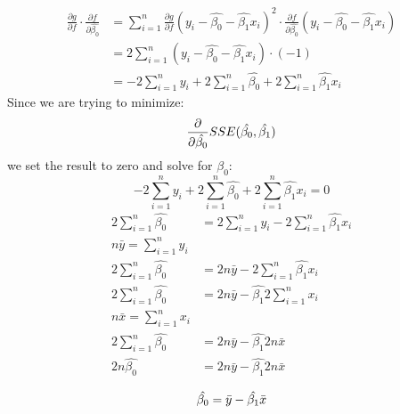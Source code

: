 \documentclass{article}
\begin{document}
\begin{align*}
\frac{\partial g}{\partial f}\cdot\frac{\partial f} {\partial \hat{\beta_0}} & = 
\sum_{i=1}^{n} \frac{\partial g}{\partial f} (y_i - \hat{\beta_{0}} - \hat{\beta_{1}}x_i)^2 \cdot \frac{\partial f} {\partial \hat{\beta_0}} (y_i - \hat{\beta_{0}} - \hat{\beta_{1}}x_i) \\
& = 2 \sum_{i=1}^{n} (y_i - \hat{\beta_{0}} - \hat{\beta_{1}}x_i) \cdot 
(-1) \\
& =  -2\sum_{i=1}^{n}y_i  + 2\sum_{i=1}^{n}\hat{\beta_{0}} + 2\sum_{i=1}^{n}\hat{\beta_{1}}x_i
\end{align*}
Since we are trying to minimize:
$$
\frac{\partial}{\partial \hat{\beta_0}}SSE(\hat{\beta_0}, \hat{\beta_1}) \\
$$
we set the result to zero and solve for $\hat{\beta_0}$:
$$
 -2\sum_{i=1}^{n}y_i  + 2\sum_{i=1}^{n}\hat{\beta_{0}} + 2\sum_{i=1}^{n}\hat{\beta_{1}}x_i  = 0 
$$
\begin{align*}
2\sum_{i=1}^{n}\hat{\beta_{0}} & =  2\sum_{i=1}^{n}y_i  -  2\sum_{i=1}^{n}\hat{\beta_{1}}x_i \\
n\bar{y} = \sum_{i = 1}^{n}y_i \\
2\sum_{i=1}^{n}\hat{\beta_{0}} & =  2n\bar{y}  -  2\sum_{i=1}^{n}\hat{\beta_{1}}x_i \\
2\sum_{i=1}^{n}\hat{\beta_{0}} & =  2n\bar{y}  -  \hat{\beta_{1}}2\sum_{i=1}^{n}x_i \\
n\bar{x} = \sum_{i = 1}^{n}x_i \\
2\sum_{i=1}^{n}\hat{\beta_{0}} & =  2n\bar{y}  -  \hat{\beta_{1}}2n\bar{x} \\
2n\hat{\beta_{0}} & =  2n\bar{y}  -  \hat{\beta_{1}}2n\bar{x} \\
\end{align*}
\begin{equation}
\hat{\beta_0} =  \bar{y} - \hat{\beta_1}\bar{x} \\ \label{eq:4}
\end{equation}
\end{document}
